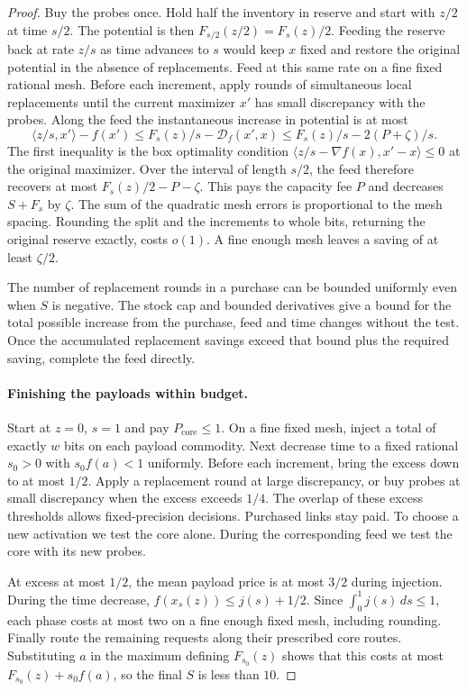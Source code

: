 \begin{proof}
Buy the probes once. Hold half the inventory in reserve and start with
$z/2$ at time $s/2$. The potential is then $F_{s/2}(z/2)=F_s(z)/2$.
Feeding the reserve back at rate $z/s$ as time advances to $s$ would
keep $x$ fixed and restore the original potential in the absence of
replacements. Feed at this same rate on a fine fixed rational mesh.
Before each increment, apply rounds of simultaneous local replacements
until the current maximizer $x'$ has small discrepancy with the probes.
Along the feed the instantaneous increase in potential is at most
\[
 \langle z/s,x'\rangle-f(x')
 \le F_s(z)/s-\mathcal D_f(x',x)
 \le F_s(z)/s-2(P+\zeta)/s .
\]
The first inequality is the box optimality condition
$\langle z/s-\nabla f(x),x'-x\rangle\le0$ at the original maximizer.
Over the interval of length $s/2$, the feed therefore recovers at
most $F_s(z)/2-P-\zeta$. This pays the capacity fee $P$ and decreases
$S+F_s$ by $\zeta$. The sum of the quadratic mesh errors is proportional
to the mesh spacing. Rounding the split and the increments to whole bits,
returning the original reserve exactly, costs $o(1)$. A fine enough
mesh leaves a saving of at least $\zeta/2$.

The number of replacement rounds in a purchase can be bounded uniformly
even when $S$ is negative. The stock cap and bounded derivatives give
a bound for the total possible increase from the purchase, feed and
time changes without the test. Once the accumulated replacement savings
exceed that bound plus the required saving, complete the feed directly.

\paragraph{Finishing the payloads within budget.}
Start at $z=0$, $s=1$ and pay $P_{\mathrm{core}}\le1$. On a fine fixed
mesh, inject a total of exactly $w$ bits on each payload commodity.
Next decrease time to a fixed rational $s_0>0$ with $s_0f(a)<1$
uniformly. Before each increment, bring the excess down to at most
$1/2$. Apply a replacement round at large discrepancy, or buy probes
at small discrepancy when the excess exceeds $1/4$. The overlap of
these excess thresholds allows fixed-precision decisions. Purchased
links stay paid. To choose a new activation we test the core alone.
During the corresponding feed we test the core with its new probes.

At excess at most $1/2$, the mean payload price is at most $3/2$
during injection. During the time decrease, $f(x_s(z))\le j(s)+1/2$.
Since $\int_0^1 j(s)\,ds\le1$, each phase costs at most two on a fine
enough fixed mesh, including rounding. Finally route the remaining
requests along their prescribed core routes. Substituting $a$ in the
maximum defining $F_{s_0}(z)$ shows that this costs at most
$F_{s_0}(z)+s_0f(a)$, so the final $S$ is less than $10$.


\end{proof}
